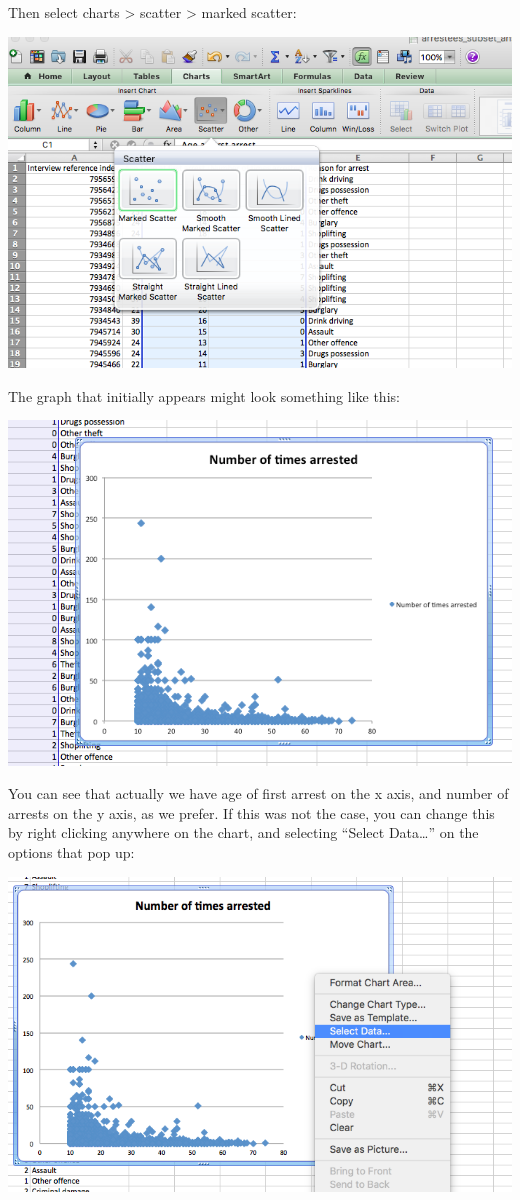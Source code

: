 \documentclass[
]{book}
\begin{document}
Then select charts \textgreater{} scatter \textgreater{} marked scatter:

\includegraphics{imgs/scatter_2.png}

The graph that initially appears might look something like this:

\includegraphics{imgs/scatter_3.png}

You can see that actually we have age of first arrest on the x axis, and number of arrests on the y axis, as we prefer. If this was not the case, you can change this by right clicking anywhere on the chart, and selecting ``Select Data\ldots{}'' on the options that pop up:

\includegraphics{imgs/scatter_4.png}
\end{document}

